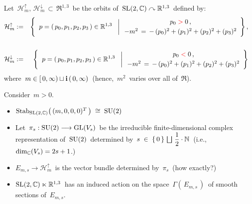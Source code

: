 Let
\,$\mathcal{H}_{m}^{\uparrow},\, \mathcal{H}_{m}^{\downarrow} \,\subset\, \Re^{1,3}$\,
be the orbits of
\,$\textnormal{SL}(2,\mathbb{C}) \curvearrowright \mathbb{R}^{1,3}$\,
defined by:
\begin{eqnarray*}
\mathcal{H}_{m}^{\uparrow}
& := &
	\left\{\;\,
		\left.
		p = (\,p_{0},p_{1},p_{2},p_{3}\,)
		\overset{{\color{white}1}}{\in}
		\Re^{1,3}
		\;\;\;\right\vert
		\begin{array}{c}
			p_{0} \;{\color{red}>}\; 0\,,
			\\
			-m^{2} \, \overset{{\color{white}1}}{=} \, -\,(p_{0})^{2} + (p_{1})^{2} + (p_{2})^{2} + (p_{3})^{2}
			\end{array}
		\right\},
\\ \\
\mathcal{H}_{m}^{\downarrow}
& := &
	\left\{\;\,
		\left.
		p = (\,p_{0},p_{1},p_{2},p_{3}\,)
		\overset{{\color{white}1}}{\in}
		\Re^{1,3}
		\;\;\;\right\vert
		\begin{array}{c}
			p_{0} \;{\color{red}<}\; 0\,,
			\\
			-m^{2} \, \overset{{\color{white}1}}{=} \, -\,(p_{0})^{2} + (p_{1})^{2} + (p_{2})^{2} + (p_{3})^{2}
			\end{array}
		\right\}
\end{eqnarray*}
where
\,$m \in [\,0,\infty) \sqcup \textnormal{\bf i}\,(\,0,\infty)$\, (hence, \,$m^{2}$\, varies over all of \,$\Re$).\,

\vskip 0.5cm
\noindent
Consider \,$m > 0$.\,
\begin{itemize}
\item
	$\textnormal{Stab}_{\textnormal{SL}(2,\mathbb{C})}\!\left(\,(m,0,0,0)^{T}\,\right) \;\cong\; \textnormal{SU}(2)$
\item
	Let
	\,$\pi_{s} : \textnormal{SU}(2) \longrightarrow \textnormal{GL}(V_{s})$\,
	be the irreducible finite-dimensional complex representation of \,$\textnormal{SU}(2)$\,
	determined by
	\,$s \;\in\; \{\,0\,\} \,\bigsqcup\, \dfrac{1}{2}\cdot\mathbb{N}$\,
	(i.e., $\dim_{\mathbb{C}}(V_{s}) = 2s + 1$.)
\item
	$E_{m,s} \longrightarrow \mathcal{H}_{m}^{\uparrow}$\,
	is the vector bundle determined by \,$\pi_{s}$\, (how exactly?)
\item
	$\textnormal{SL}(2,\mathbb{C}) \ltimes \mathbb{R}^{1,3}$\,
	has an induced action on the space
	\,$\Gamma(\,E_{m,s}\,)$\,
	of smooth sections of
	\,$E_{m,s}$.\,
\end{itemize}




